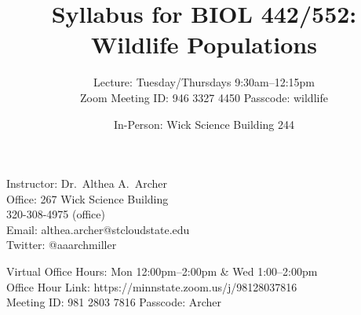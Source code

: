 \documentclass{tufte-handout}
\title{Syllabus for BIOL 442/552: Wildlife Populations}										%
\author{Lecture: Tuesday/Thursdays 9:30am--12:15pm \\
\color{gray} Zoom Meeting ID: 946 3327 4450
Passcode: wildlife \color{black}}								%
\date{In-Person: Wick Science Building 244}
\begin{document}
\maketitle

Instructor: Dr.~Althea A.~Archer\\
Office: 267 Wick Science Building\\
320-308-4975 (office) \\
Email: althea.archer@stcloudstate.edu\\
Twitter: @aaarchmiller

\color{gray} Virtual Office Hours: Mon 12:00pm--2:00pm \& Wed 1:00--2:00pm\\
Office Hour Link: https://minnstate.zoom.us/j/98128037816\\
Meeting ID: 981 2803 7816 Passcode: Archer \color{black}
\end{document}
